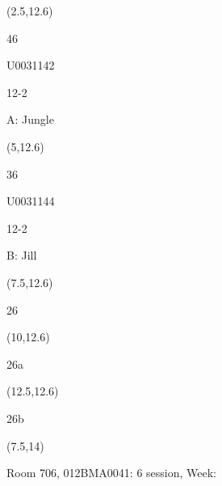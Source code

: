 \documentclass[a4paper]{article}
\newcommand{\myseat}[4]{%
	\vspace{0.1cm}
	\parbox[t][2.5cm][t]{3.5cm}{
	\small #1 %
	\begin{description}
	\vspace{-0.1cm}
	\item [ID:] #2
	\vspace{-0.1cm}
	\item [Team:] #3 \normalsize
	\vspace{-0.1cm}
	\item \normalsize #4
	\vspace{-0.1cm}
	\end{description}
	}
}
\begin{document}
\begin{textblock}{2.5}(2.5,12.6)
\myseat{46}{U0031142}{12-2}{A: Jungle}
\end{textblock}

\begin{textblock}{2.5}(5,12.6)
\myseat{36}{U0031144}{12-2}{B: Jill}
\end{textblock}

\begin{textblock}{2.5}(7.5,12.6)
\textblockcolor{}
\myseat{26}{}{}{}
\end{textblock}

\begin{textblock}{2.5}(10,12.6)
\textblockcolor{}
\myseat{26a}{}{}{}
\end{textblock}

\begin{textblock}{2.5}(12.5,12.6)
\textblockcolor{}
\myseat{26b}{}{}{}
\end{textblock}

\begin{textblock}{7.5}(7.5,14)
\textblockcolor{}
\parbox[t][2.2cm][t]{9.5cm}{%
\large Room 706, 012BMA0041: 6 session, Week: 
}
\end{textblock}
\end{document}
